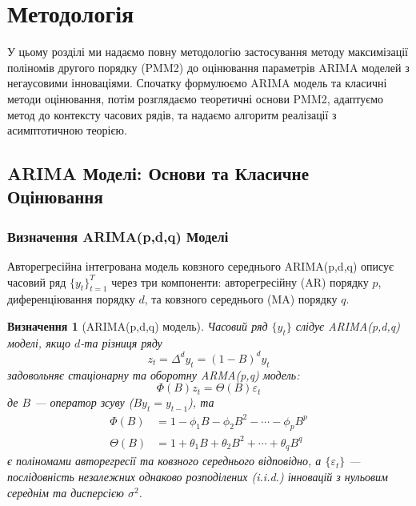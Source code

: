 \documentclass[12pt,a4paper]{article}
\newtheorem{definition}[theorem]{Визначення}
\begin{document}
\section{Методологія}
\label{sec:methodology}

У цьому розділі ми надаємо повну методологію застосування методу максимізації поліномів другого порядку (PMM2) до оцінювання параметрів ARIMA моделей з негаусовими інноваціями. Спочатку формулюємо ARIMA модель та класичні методи оцінювання, потім розглядаємо теоретичні основи PMM2, адаптуємо метод до контексту часових рядів, та надаємо алгоритм реалізації з асимптотичною теорією.

\subsection{ARIMA Моделі: Основи та Класичне Оцінювання}
\label{subsec:arima_basics}

\subsubsection{Визначення ARIMA(p,d,q) Моделі}

Авторегресійна інтегрована модель ковзного середнього ARIMA(p,d,q) описує часовий ряд $\{y_t\}_{t=1}^T$ через три компоненти: авторегресійну (AR) порядку $p$, диференціювання порядку $d$, та ковзного середнього (MA) порядку $q$.

\begin{definition}[ARIMA(p,d,q) модель]
Часовий ряд $\{y_t\}$ слідує ARIMA(p,d,q) моделі, якщо $d$-та різниця ряду
\begin{equation}
\label{eq:differencing}
z_t = \Delta^d y_t = (1-B)^d y_t
\end{equation}
задовольняє стаціонарну та оборотну ARMA(p,q) модель:
\begin{equation}
\label{eq:arma}
\Phi(B) z_t = \Theta(B) \varepsilon_t
\end{equation}
де $B$ --- оператор зсуву ($B y_t = y_{t-1}$), та
\begin{align}
\Phi(B) &= 1 - \phi_1 B - \phi_2 B^2 - \cdots - \phi_p B^p \label{eq:ar_poly} \\
\Theta(B) &= 1 + \theta_1 B + \theta_2 B^2 + \cdots + \theta_q B^q \label{eq:ma_poly}
\end{align}
є поліномами авторегресії та ковзного середнього відповідно, а $\{\varepsilon_t\}$ --- послідовність незалежних однаково розподілених (i.i.d.) інновацій з нульовим середнім та дисперсією $\sigma^2$.
\end{definition}
\end{document}
